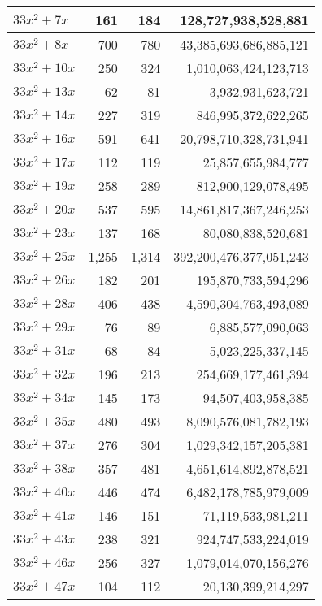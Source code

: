 \documentclass[a4paper]{amsproc}
\theoremstyle{plain}
\begin{document}
\begin{longtable}{ | l | r | r | r | }
$33x^2 + 7x$ & 161 & 184 & 128{,}727{,}938{,}528{,}881 \\ \hline
$33x^2 + 8x$ & 700 & 780 & 43{,}385{,}693{,}686{,}885{,}121 \\ \hline
$33x^2 + 10x$ & 250 & 324 & 1{,}010{,}063{,}424{,}123{,}713 \\ \hline
$33x^2 + 13x$ & 62 & 81 & 3{,}932{,}931{,}623{,}721 \\ \hline
$33x^2 + 14x$ & 227 & 319 & 846{,}995{,}372{,}622{,}265 \\ \hline
$33x^2 + 16x$ & 591 & 641 & 20{,}798{,}710{,}328{,}731{,}941 \\ \hline
$33x^2 + 17x$ & 112 & 119 & 25{,}857{,}655{,}984{,}777 \\ \hline
$33x^2 + 19x$ & 258 & 289 & 812{,}900{,}129{,}078{,}495 \\ \hline
$33x^2 + 20x$ & 537 & 595 & 14{,}861{,}817{,}367{,}246{,}253 \\ \hline
$33x^2 + 23x$ & 137 & 168 & 80{,}080{,}838{,}520{,}681 \\ \hline
$33x^2 + 25x$ & 1{,}255 & 1{,}314 & 392{,}200{,}476{,}377{,}051{,}243 \\ \hline
$33x^2 + 26x$ & 182 & 201 & 195{,}870{,}733{,}594{,}296 \\ \hline
$33x^2 + 28x$ & 406 & 438 & 4{,}590{,}304{,}763{,}493{,}089 \\ \hline
$33x^2 + 29x$ & 76 & 89 & 6{,}885{,}577{,}090{,}063 \\ \hline
$33x^2 + 31x$ & 68 & 84 & 5{,}023{,}225{,}337{,}145 \\ \hline
$33x^2 + 32x$ & 196 & 213 & 254{,}669{,}177{,}461{,}394 \\ \hline
$33x^2 + 34x$ & 145 & 173 & 94{,}507{,}403{,}958{,}385 \\ \hline
$33x^2 + 35x$ & 480 & 493 & 8{,}090{,}576{,}081{,}782{,}193 \\ \hline
$33x^2 + 37x$ & 276 & 304 & 1{,}029{,}342{,}157{,}205{,}381 \\ \hline
$33x^2 + 38x$ & 357 & 481 & 4{,}651{,}614{,}892{,}878{,}521 \\ \hline
$33x^2 + 40x$ & 446 & 474 & 6{,}482{,}178{,}785{,}979{,}009 \\ \hline
$33x^2 + 41x$ & 146 & 151 & 71{,}119{,}533{,}981{,}211 \\ \hline
$33x^2 + 43x$ & 238 & 321 & 924{,}747{,}533{,}224{,}019 \\ \hline
$33x^2 + 46x$ & 256 & 327 & 1{,}079{,}014{,}070{,}156{,}276 \\ \hline
$33x^2 + 47x$ & 104 & 112 & 20{,}130{,}399{,}214{,}297 \\ \hline

\end{longtable}
\end{document}
